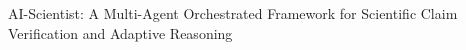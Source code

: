 AI-Scientist: A Multi-Agent Orchestrated Framework for Scientific Claim Verification and Adaptive Reasoning
